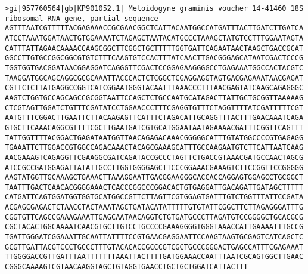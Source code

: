 \documentclass[11pt]{article}
\begin{document}
\begin{Verbatim}[commandchars=\\\{\}]
>gi|957760564|gb|KP901052.1| Meloidogyne graminis voucher 14-41460 18S ribosomal RNA gene, partial sequence
AGTTTAATCGTTTTTACGAGAAACCGCGAACGGCTCATTACAATGGCCATGATTTACTTGATCTTGATCA
ATCCTAAATGGATAACTGTGGAAAATCTAGAGCTAATACATGCCCTAAAGCTATGTCCTTTGGAATAGTA
CATTTATTAGAACAAAACCAAGCGGCTTCGGCTGCTTTTTGGTGATTCAGAATAACTAAGCTGACCGCAT
GGCCTTGTGCCGGCGGCGTGTCTTTCAAGTGTCCACTTTATCAACTTGACGGGAGCATAATCGACTCCCG
TGGTGGTGACGGATAACGGAGGATCAGGGTTCGACTCCGGAGAAGGGGCCTGAGAAATGGCCACTACGTC
TAAGGATGGCAGCAGGCGCGCAAATTACCCACTCTCGGCTCGAGGAGGTAGTGACGAGAAATAACGAGAT
CGTTCTCTTATGAGGCCGGTCATCGGAATGGGTACAATTTAAACCCTTTAACGAGTATCAAGCAGAGGGC
AAGTCTGGTGCCAGCAGCCGCGGTAATTCCAGCTCTGCCAATGCATAGACTTATTGCTGCGGTTAAAAAG
CTCGTAGTTGGATCTGTTTCGATATCCTGGAACCCTTTCGAGGTGTTTCTAGGTTTTATCGATTTTTCGT
AATGTTTCGGACTTGAATTCTTACAAGAGTTCATTTCTAGACATTGCAGGTTTACTTTGAACAAATCAGA
GTGCTTCAAACAGGCGTTTTCGCTTGAATGATCGTGCATGGAATAATAGAAAACGATTTCGGTTCAGTTT
TATTGGTTTTACGGACTGAGATAATGGTTAACAGAGACAAACGGGGGCATTTGTATGGCCCCGTGAGAGG
TGAAATTCTTGGACCGTGGCCAGACAAACTACAGCGAAAGCATTTGCCAAGAATGTCTTCATTAATCAAG
AACGAAAGTCAGAGGTTCGAAGGCGATCAGATACCGCCCTAGTTCTGACCGTAAACGATGCCAACTAGCG
ATCCGCCGATGGAGATTATATTGCCTTGGTGGGGAGCTTCCCGGAAACGAAAGTCTTCCGGTTCCGGGGG
AAGTATGGTTGCAAAGCTGAAACTTAAAGGAATTGACGGAAGGGCACCACCAGGAGTGGAGCCTGCGGCT
TAATTTGACTCAACACGGGGAAACTCACCCGGCCCGGACACTGTGAGGATTGACAGATTGATAGCTTTTT
CATGATTCAGTGGATGGTGGTGCATGGCCGTTCTTAGTTCGTGGAGTGATTTGTCTGGTTTATTCCGATA
ACGAGCGAGACTCTAACCTACTAAATAGCTGATACATATTTTTGTGTATTCGGCTTCTTAGAGGGATTTG
CGGTGTTCAGCCGAAAGAAATTGAGCAATAACAGGTCTGTGATGCCCTTAGATGTCCGGGGCTGCACGCG
CGCTACACTGGCAAAATCAACGTGCTTGTCCTGCCCCGAAAGGGGTGGGTAAACCATTGAAAATTTGCCG
TGATTGGGATCGGAAATTGCAATTATTTTCCGTGAACGAGGAATTCCAAGTAAGTGCGAGTCATCAGCTC
GCGTTGATTACGTCCCTGCCCTTTGTACACACCGCCCGTCGCTGCCCGGGACTGAGCCATTTCGAGAAAT
TTGGGGACCGTTGATTTAATTTTTTTAAATTACTTTTGATGGAAACCAATTTAATCGCAGTGGCTTGAAC
CGGGCAAAAGTCGTAACAAGGTAGCTGTAGGTGAACCTGCTGCTGGATCATTACTTT


\end{Verbatim}
\end{document}
